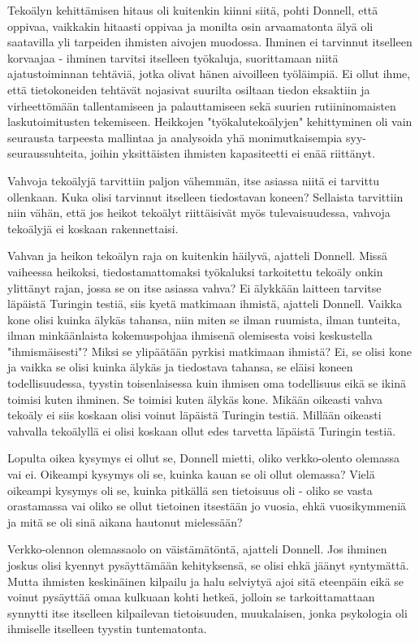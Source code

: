 Tekoälyn kehittämisen hitaus oli kuitenkin kiinni siitä, pohti Donnell, että oppivaa, vaikkakin hitaasti oppivaa ja monilta osin arvaamatonta älyä oli saatavilla yli tarpeiden ihmisten aivojen muodossa. Ihminen ei tarvinnut itselleen korvaajaa - ihminen tarvitsi itselleen työkaluja, suorittamaan niitä ajatustoiminnan tehtäviä, jotka olivat hänen aivoilleen työläimpiä. Ei ollut ihme, että tietokoneiden tehtävät nojasivat suurilta osiltaan tiedon eksaktiin ja virheettömään tallentamiseen ja palauttamiseen sekä suurien rutiininomaisten laskutoimitusten tekemiseen. Heikkojen "työkalutekoälyjen" kehittyminen oli vain seurausta tarpeesta mallintaa ja analysoida yhä monimutkaisempia syy-seuraussuhteita, joihin yksittäisten ihmisten kapasiteetti ei enää riittänyt.


Vahvoja tekoälyjä tarvittiin paljon vähemmän, itse asiassa niitä ei tarvittu ollenkaan. Kuka olisi tarvinnut itselleen tiedostavan koneen? Sellaista tarvittiin niin vähän, että jos heikot tekoälyt riittäisivät myös tulevaisuudessa, vahvoja tekoälyjä ei koskaan rakennettaisi.


Vahvan ja heikon tekoälyn raja on kuitenkin häilyvä, ajatteli Donnell. Missä vaiheessa heikoksi, tiedostamattomaksi työkaluksi tarkoitettu tekoäly onkin ylittänyt rajan, jossa se on itse asiassa vahva? Ei älykkään laitteen tarvitse läpäistä Turingin testiä, siis kyetä matkimaan ihmistä, ajatteli Donnell. Vaikka kone olisi kuinka älykäs tahansa, niin miten se ilman ruumista, ilman tunteita, ilman minkäänlaista kokemuspohjaa ihmisenä olemisesta voisi keskustella "ihmismäisesti"? Miksi se ylipäätään pyrkisi matkimaan ihmistä? Ei, se olisi kone ja vaikka se olisi kuinka älykäs ja tiedostava tahansa, se eläisi koneen todellisuudessa, tyystin toisenlaisessa kuin ihmisen oma todellisuus eikä se ikinä toimisi kuten ihminen. Se toimisi kuten älykäs kone. Mikään oikeasti vahva tekoäly ei siis koskaan olisi voinut läpäistä Turingin testiä. Millään oikeasti vahvalla tekoälyllä ei olisi koskaan ollut edes tarvetta läpäistä Turingin testiä.


Lopulta oikea kysymys ei ollut se, Donnell mietti, oliko verkko-olento olemassa vai ei. Oikeampi kysymys oli se, kuinka kauan se oli ollut olemassa? Vielä oikeampi kysymys oli se, kuinka pitkällä sen tietoisuus oli - oliko se vasta orastamassa vai oliko se ollut tietoinen itsestään jo vuosia, ehkä vuosikymmeniä ja mitä se oli sinä aikana hautonut mielessään?


Verkko-olennon olemassaolo on väistämätöntä, ajatteli Donnell. Jos ihminen joskus olisi kyennyt pysäyttämään kehityksensä, se olisi ehkä jäänyt syntymättä. Mutta ihmisten keskinäinen kilpailu ja halu selviytyä ajoi sitä eteenpäin eikä se voinut pysäyttää omaa kulkuaan kohti hetkeä, jolloin se tarkoittamattaan synnytti itse itselleen kilpailevan tietoisuuden, muukalaisen, jonka psykologia oli ihmiselle itselleen tyystin tuntematonta.


